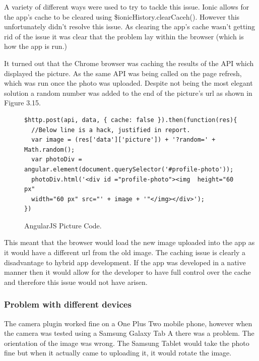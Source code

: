 A variety of different ways were used to try to tackle this issue. Ionic allows for the app's cache to be cleared using \$ionicHistory.clearCaceh(). However this unfortunately didn't resolve this issue. As clearing the app's cache wasn't getting rid of the issue it was clear that the problem lay within the browser (which is how the app is run.)

It turned out that the Chrome browser was caching the results of the API which displayed the picture. As the same API was being called on the page refresh, which was run once the photo was uploaded. Despite not being the most elegant solution a random number was added to the end of the picture's url as shown in Figure 3.15.
\begin{center}
\begin{figure}[H]
\begin{verbatim}
$http.post(api, data, { cache: false }).then(function(res){
  //Below line is a hack, justified in report.
  var image = (res['data']['picture']) + '?random=' + Math.random();
  var photoDiv = angular.element(document.querySelector('#profile-photo'));
  photoDiv.html('<div id ="profile-photo"><img  height="60 px" 
  width="60 px" src="' + image + '"</img></div>');
})
\end{verbatim}
\caption{AngularJS Picture Code.}
\end{figure}
\end{center}

This meant that the browser would load the new image uploaded into the app as it would have a different url from the old image. The caching issue is clearly a disadvantage to hybrid app development. If the app was developed in a native manner then it would allow for the developer to have full control over the cache and therefore this issue would not have arisen. 

\subsubsection{Problem with different devices}
The camera plugin worked fine on a One Plus Two mobile phone, however when the camera was tested using a Samsung Galaxy Tab A there was a problem. The orientation of the image was wrong. The Samsung Tablet would take the photo fine but when it actually came to uploading it, it would rotate the image. 

